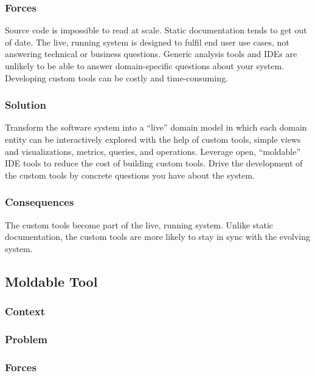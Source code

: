 \documentclass[sigconf]{acmart}
\begin{document}
\subsubsection*{Forces}
Source code is impossible to read at scale.
Static documentation tends to get out of date.
The live, running system is designed to fulfil end user use cases, not answering technical or business questions.
Generic analysis tools and IDEs are unlikely to be able to answer domain-specific questions about your system.
Developing custom tools can be costly and time-consuming.

\subsubsection*{Solution}
Transform the software system into a ``live'' domain model in which each domain entity can be interactively explored with the help of custom tools, \ie simple views and visualizations, metrics, queries, and operations.
Leverage open, ``moldable'' IDE tools to reduce the cost of building custom tools.
Drive the development of the custom tools by concrete questions you have about the system.


\subsubsection*{Consequences}
The custom tools become part of the live, running system.
Unlike static documentation, the custom tools are more likely to stay in sync with the evolving system.


\subsection*{Moldable Tool}\label{pat:moldableTool}

\subsubsection*{Context}
\subsubsection*{Problem}
\subsubsection*{Forces}
\end{document}
